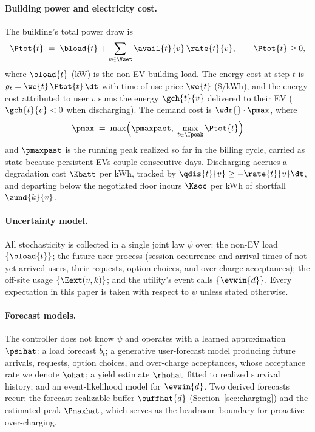 \paragraph{Building power and electricity cost.} The building's total
power draw is
\begin{equation}\label{eq:load}
\Ptot{t} \;=\; \bload{t} + \sum_{v \in \Vset} \avail{t}{v}\,\rate{t}{v},
\qquad \Ptot{t} \ge 0,
\end{equation}
where $\bload{t}$ (kW) is the non-EV building load. The energy cost at
step $t$ is $g_t = \we{t}\,\Ptot{t}\,\dt$ with time-of-use price
$\we{t}$ (\$/kWh), and the energy cost attributed to user $v$ sums the
energy $\gch{t}{v}$ delivered to their EV ($\gch{t}{v} < 0$ when
discharging). The demand cost is $\wdr{}\cdot\pmax$, where
\begin{equation}\label{eq:peak}
\pmax \;=\; \max\Bigl(\pmaxpast,\; \max_{t \in \Tpeak} \Ptot{t}\Bigr)
\end{equation}
and $\pmaxpast$ is the running peak realized so far in the billing
cycle, carried as state because persistent EVs couple consecutive days.
Discharging accrues a degradation cost $\Kbatt$ per kWh, tracked by
$\qdis{t}{v} \ge -\rate{t}{v}\dt$, and departing below the negotiated
floor incurs $\Ksoc$ per kWh of shortfall $\zund{k}{v}$.

\paragraph{Uncertainty model.} All stochasticity is collected in a
single joint law $\psi$ over: the non-EV load $\{\bload{t}\}$; the
future-user process (session occurrence and arrival times of
not-yet-arrived users, their requests, option choices, and over-charge
acceptances); the off-site usage $\{\Eext(v,k)\}$; and the utility's
event calls $\{\evwin{d}\}$. Every expectation in this paper is taken
with respect to $\psi$ unless stated otherwise.

\paragraph{Forecast models.} The controller does not know $\psi$ and
operates with a learned approximation $\psihat$: a load forecast
$\hat{b}_t$; a generative user-forecast model producing future arrivals,
requests, option choices, and over-charge acceptances, whose acceptance
rate we denote $\ohat$; a yield estimate $\rhohat$ fitted to realized
survival history; and an event-likelihood model for $\evwin{d}$. Two
derived forecasts recur: the forecast realizable buffer $\buffhat{d}$
(Section~\ref{sec:charging}) and the estimated peak $\Pmaxhat$, which
serves as the headroom boundary for proactive over-charging.

